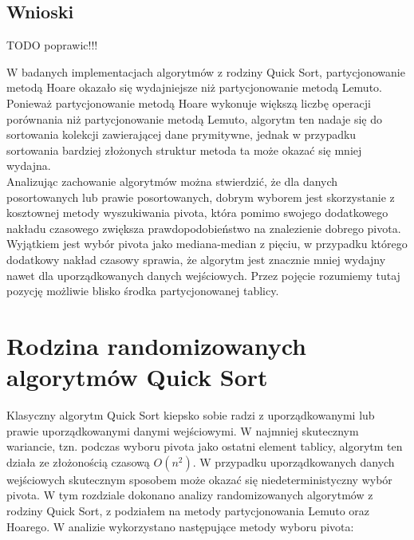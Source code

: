 \begin{figure}[]
	\centering
	
	\caption[]{}
	\label{fig:quick-sort-deterministic-pivot-cost-factor}
\end{figure}

\begin{figure}[]
	\centering
	
	\caption[]{}
	\label{fig:quick-sort-deterministic-pivot-density}
\end{figure}

\begin{figure}[]
	\centering
	
	\caption[]{}
	\label{fig:quick-sort-deterministic-pivot-all}
\end{figure}

\subsection{Wnioski}
TODO poprawic!!!

W badanych implementacjach algorytmów z rodziny Quick Sort, partycjonowanie metodą Hoare okazało się wydajniejsze niż partycjonowanie metodą Lemuto. Ponieważ partycjonowanie metodą Hoare wykonuje większą liczbę operacji porównania niż partycjonowanie metodą Lemuto, algorytm ten nadaje się do sortowania kolekcji zawierającej dane prymitywne, jednak w przypadku sortowania bardziej złożonych struktur metoda ta może okazać się mniej wydajna.\\

Analizując zachowanie algorytmów można stwierdzić, że dla danych posortowanych lub prawie posortowanych, dobrym wyborem jest skorzystanie z kosztownej metody wyszukiwania pivota, która pomimo swojego dodatkowego nakładu czasowego zwiększa prawdopodobieństwo na znalezienie dobrego pivota. Wyjątkiem jest wybór pivota jako mediana-median z pięciu, w przypadku którego dodatkowy nakład czasowy sprawia, że algorytm jest znacznie mniej wydajny nawet dla uporządkowanych danych wejściowych. Przez pojęcie  rozumiemy tutaj pozycję możliwie blisko środka partycjonowanej tablicy.\\

\section{Rodzina randomizowanych algorytmów Quick Sort}
Klasyczny algorytm Quick Sort kiepsko sobie radzi z uporządkowanymi lub prawie uporządkowanymi danymi wejściowymi. W najmniej skutecznym wariancie, tzn. podczas wyboru pivota jako ostatni element tablicy, algorytm ten działa ze złożonością czasową $O(n^2)$. W przypadku uporządkowanych danych wejściowych skutecznym sposobem może okazać się niedeterministyczny wybór pivota. W tym rozdziale dokonano analizy randomizowanych algorytmów z rodziny Quick Sort, z podziałem na metody partycjonowania Lemuto oraz Hoarego. W analizie wykorzystano następujące metody wyboru pivota:

